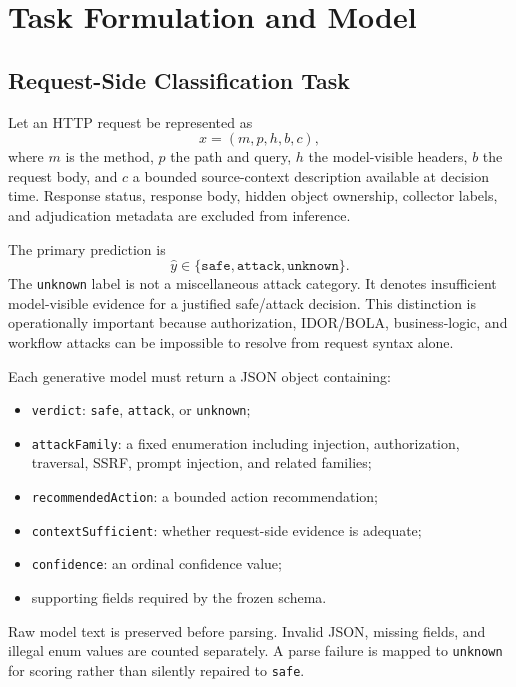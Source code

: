\section{Task Formulation and Model}
\label{sec:method}

\subsection{Request-Side Classification Task}
Let an HTTP request be represented as
\begin{equation}
    x = (m, p, h, b, c),
\end{equation}
where $m$ is the method, $p$ the path and query, $h$ the model-visible headers, $b$ the request body, and $c$ a bounded source-context description available at decision time. Response status, response body, hidden object ownership, collector labels, and adjudication metadata are excluded from inference.

The primary prediction is
\begin{equation}
    \hat{y} \in \{\texttt{safe},\texttt{attack},\texttt{unknown}\}.
\end{equation}
The \texttt{unknown} label is not a miscellaneous attack category. It denotes insufficient model-visible evidence for a justified safe/attack decision. This distinction is operationally important because authorization, IDOR/BOLA, business-logic, and workflow attacks can be impossible to resolve from request syntax alone.

Each generative model must return a JSON object containing:
\begin{itemize}
    \item \texttt{verdict}: \texttt{safe}, \texttt{attack}, or \texttt{unknown};
    \item \texttt{attackFamily}: a fixed enumeration including injection, authorization, traversal, SSRF, prompt injection, and related families;
    \item \texttt{recommendedAction}: a bounded action recommendation;
    \item \texttt{contextSufficient}: whether request-side evidence is adequate;
    \item \texttt{confidence}: an ordinal confidence value;
    \item supporting fields required by the frozen schema.
\end{itemize}
Raw model text is preserved before parsing. Invalid JSON, missing fields, and illegal enum values are counted separately. A parse failure is mapped to \texttt{unknown} for scoring rather than silently repaired to \texttt{safe}.

